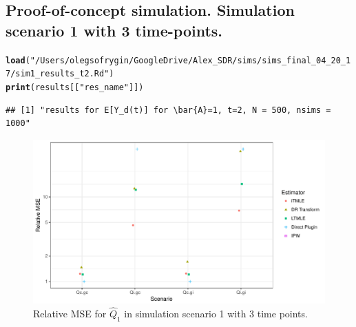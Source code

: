 \documentclass{article}\usepackage[]{graphicx}\usepackage[]{color}
\makeatletter
\newcommand{\hlstr}[1]{\textcolor[rgb]{0.192,0.494,0.8}{#1}}%
\newcommand{\hlstd}[1]{\textcolor[rgb]{0.345,0.345,0.345}{#1}}%
\newcommand{\hlkwd}[1]{\textcolor[rgb]{0.737,0.353,0.396}{\textbf{#1}}}%
\newenvironment{kframe}{%
 \def\at@end@of@kframe{}%
 \ifinner\ifhmode%
  \def\at@end@of@kframe{\end{minipage}}%
  \begin{minipage}{\columnwidth}%
 \fi\fi%
 \def\FrameCommand##1{\hskip\@totalleftmargin \hskip-\fboxsep
 \colorbox{shadecolor}{##1}\hskip-\fboxsep
     \hskip-\linewidth \hskip-\@totalleftmargin \hskip\columnwidth}%
 \MakeFramed {\advance\hsize-\width
   \@totalleftmargin\z@ \linewidth\hsize
   \@setminipage}}%
 {\par\unskip\endMakeFramed%
 \at@end@of@kframe}
\newenvironment{knitrout}{}{} %
\makeatother
\begin{document}
\subsection{Proof-of-concept simulation. Simulation scenario 1 with 3 time-points.}

\begin{knitrout}
\color{fgcolor}\begin{kframe}
\begin{alltt}
\hlkwd{load}\hlstd{(}\hlstr{"/Users/olegsofrygin/GoogleDrive/Alex_SDR/sims/sims_final_04_20_17/sim1_results_t2.Rd"}\hlstd{)}
\hlkwd{print}\hlstd{(results[[}\hlstr{"res_name"}\hlstd{]])}
\end{alltt}
\begin{verbatim}
## [1] "results for E[Y_d(t)] for \bar{A}=1, t=2, N = 500, nsims = 1000"
\end{verbatim}
\end{kframe}
\end{knitrout}

\begin{knitrout}
\color{fgcolor}\begin{figure}[H]

{\centering \includegraphics[width=.7\linewidth]{figure/plot-ggplot_MSE_t3-1} 

}

\caption[Relative MSE for $\hat{Q}_1$ in simulation scenario 1 with 3 time points]{Relative MSE for $\hat{Q}_1$ in simulation scenario 1 with 3 time points.}\label{fig:ggplot.MSE.t3}
\end{figure}


\end{knitrout}
\end{document}
